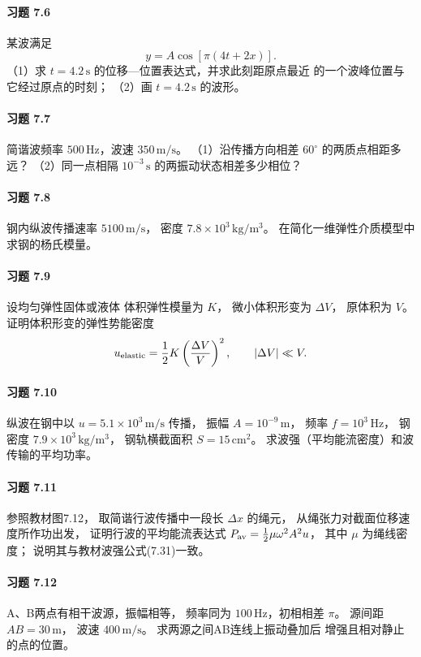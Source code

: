 \paragraph{习题 7.6}
某波满足
\[
 y=A\cos[\pi(4t+2x)].
\]
（1）求 \(t=4.2\,\mathrm s\)
的位移—位置表达式，并求此刻距原点最近
的一个波峰位置与它经过原点的时刻；
（2）画 \(t=4.2\,\mathrm s\) 的波形。

\paragraph{习题 7.7}
简谐波频率
\(500\,\mathrm{Hz}\)，波速
\(350\,\mathrm{m/s}\)。
（1）沿传播方向相差 \(60^\circ\)
的两质点相距多远？
（2）同一点相隔
\(10^{-3}\,\mathrm s\) 的两振动状态相差多少相位？

\paragraph{习题 7.8}
钢内纵波传播速率
\(5100\,\mathrm{m/s}\)，
密度
\(7.8\times10^3\,\mathrm{kg/m^3}\)。
在简化一维弹性介质模型中求钢的杨氏模量。

\paragraph{习题 7.9}
设均匀弹性固体或液体
体积弹性模量为 \(K\)，
微小体积形变为 \(\Delta V\)，
原体积为 \(V\)。
证明体积形变的弹性势能密度
\[
 u_{\rm elastic}=\frac12K
 \left(\frac{\Delta V}{V}\right)^2,
 \qquad|\Delta V|\ll V.
\]

\paragraph{习题 7.10}
纵波在钢中以
\(u=5.1\times10^3\,\mathrm{m/s}\) 传播，
振幅 \(A=10^{-9}\,\mathrm m\)，
频率 \(f=10^3\,\mathrm{Hz}\)，
钢密度
\(7.9\times10^3\,\mathrm{kg/m^3}\)，
钢轨横截面积
\(S=15\,\mathrm{cm^2}\)。
求波强（平均能流密度）和波传输的平均功率。

\paragraph{习题 7.11}
参照教材图7.12，
取简谐行波传播中一段长
\(\Delta x\) 的绳元，
从绳张力对截面位移速度所作功出发，
证明行波的平均能流表达式
\(P_{\rm av}=\tfrac12\mu\omega^2A^2u\)，
其中 \(\mu\) 为绳线密度；
说明其与教材波强公式(7.31)一致。

\paragraph{习题 7.12}
A、B两点有相干波源，振幅相等，
频率同为
\(100\,\mathrm{Hz}\)，初相相差
\(\pi\)。
源间距
\(AB=30\,\mathrm m\)，
波速 \(400\,\mathrm{m/s}\)。
求两源之间AB连线上振动叠加后
增强且相对静止的点的位置。

